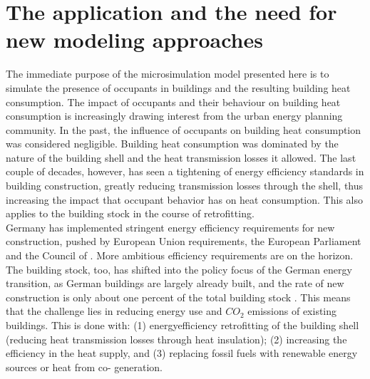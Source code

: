 \documentclass[11pt]{IJM-article}
\begin{document}

\section{The application and the need for new modeling approaches}\label{sec:1}

The immediate purpose of the microsimulation model presented here is to
simulate the presence of occupants in buildings and the resulting building heat
consumption. The impact of occupants and their behaviour on building heat
consumption is increasingly drawing interest from the urban energy planning
community. In the past, the influence of occupants on building heat consumption
was considered negligible. Building heat consumption was dominated by the
nature of the building shell and the heat transmission losses it allowed. The
last couple of decades, however, has seen a tightening of energy efficiency
standards in building construction, greatly reducing transmission losses
through the shell, thus increasing the impact that occupant behavior has on
heat consumption. This also applies to the building stock in the course of
retrofitting.\\

Germany has implemented stringent energy efficiency requirements for new
construction, pushed by European Union requirements, the European Parliament
and the Council of .  More ambitious efficiency
requirements are on the horizon.  The building stock, too, has shifted into the
policy focus of the German energy transition, as German buildings are largely
already built, and the rate of new construction is only about one percent of
the total building stock .  This means that the challenge
lies in reducing energy use and $CO_{2}$ emissions of existing buildings.  This
is done with: (1) energyefficiency retrofitting of the building shell (reducing
heat transmission losses through heat insulation); (2) increasing the
efficiency in the heat supply, and (3) replacing fossil fuels with renewable
energy sources or heat from co- generation.\\
\end{document}
